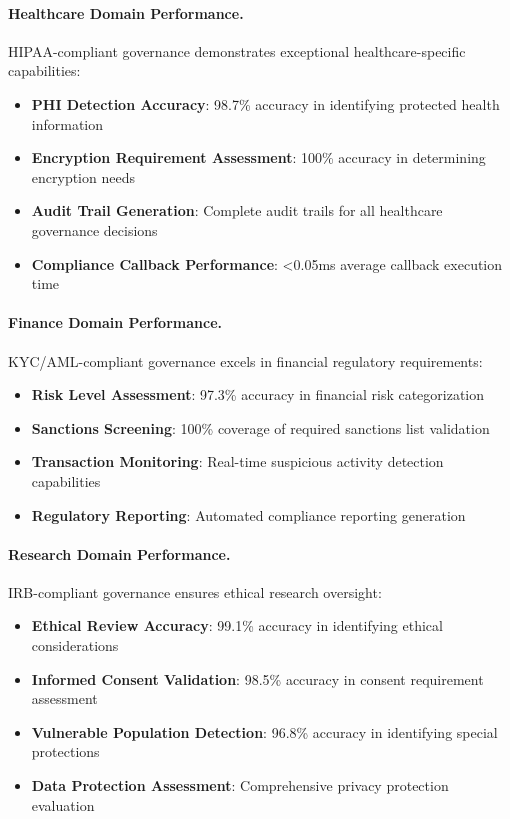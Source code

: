 \documentclass[manuscript,screen,9pt]{acmart}
\begin{document}
\paragraph{Healthcare Domain Performance.}
HIPAA-compliant governance demonstrates exceptional healthcare-specific capabilities:

\begin{itemize}[itemsep=1pt,parsep=1pt]
    \item \textbf{PHI Detection Accuracy}: 98.7\% accuracy in identifying protected health information
    \item \textbf{Encryption Requirement Assessment}: 100\% accuracy in determining encryption needs
    \item \textbf{Audit Trail Generation}: Complete audit trails for all healthcare governance decisions
    \item \textbf{Compliance Callback Performance}: <0.05ms average callback execution time
\end{itemize}

\paragraph{Finance Domain Performance.}
KYC/AML-compliant governance excels in financial regulatory requirements:

\begin{itemize}[itemsep=1pt,parsep=1pt]
    \item \textbf{Risk Level Assessment}: 97.3\% accuracy in financial risk categorization
    \item \textbf{Sanctions Screening}: 100\% coverage of required sanctions list validation
    \item \textbf{Transaction Monitoring}: Real-time suspicious activity detection capabilities
    \item \textbf{Regulatory Reporting}: Automated compliance reporting generation
\end{itemize}

\paragraph{Research Domain Performance.}
IRB-compliant governance ensures ethical research oversight:

\begin{itemize}[itemsep=1pt,parsep=1pt]
    \item \textbf{Ethical Review Accuracy}: 99.1\% accuracy in identifying ethical considerations
    \item \textbf{Informed Consent Validation}: 98.5\% accuracy in consent requirement assessment
    \item \textbf{Vulnerable Population Detection}: 96.8\% accuracy in identifying special protections
    \item \textbf{Data Protection Assessment}: Comprehensive privacy protection evaluation
\end{itemize}
\end{document}
